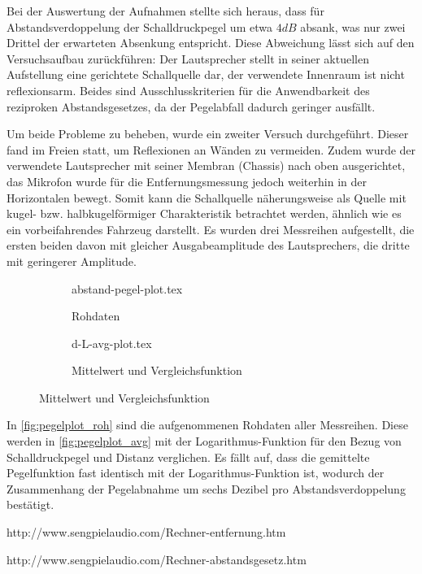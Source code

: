 Bei der Auswertung der Aufnahmen stellte sich heraus, dass für Abstandsverdoppelung der Schalldruckpegel um etwa \(4 dB\) absank, was nur zwei Drittel der erwarteten Absenkung entspricht. Diese Abweichung lässt sich auf den Versuchsaufbau zurückführen: Der Lautsprecher stellt in seiner aktuellen Aufstellung eine gerichtete Schallquelle dar, der verwendete Innenraum ist nicht reflexionsarm. Beides sind Ausschlusskriterien für die Anwendbarkeit des reziproken Abstandsgesetzes, da der Pegelabfall dadurch geringer ausfällt.

Um beide Probleme zu beheben, wurde ein zweiter Versuch durchgeführt. Dieser fand im Freien statt, um Reflexionen an Wänden zu vermeiden. Zudem wurde der verwendete Lautsprecher mit seiner Membran (Chassis) nach oben ausgerichtet, das Mikrofon wurde für die Entfernungsmessung jedoch weiterhin in der Horizontalen bewegt. Somit kann die Schallquelle näherungsweise als Quelle mit kugel- bzw. halbkugelförmiger Charakteristik betrachtet werden, ähnlich wie es ein vorbeifahrendes Fahrzeug darstellt. Es wurden drei Messreihen aufgestellt, die ersten beiden davon mit gleicher Ausgabeamplitude des Lautsprechers, die dritte mit geringerer Amplitude.

\begin{figure}[h]
    \begin{subfigure}{.5\textwidth}
        \centering
        {abstand-pegel-plot.tex}
        \caption{Rohdaten}
        \label{fig:pegelplot_roh}
    \end{subfigure}
    \hfil
    \begin{subfigure}{.5\textwidth}
        \centering
        {d-L-avg-plot.tex}
        \caption{Mittelwert und Vergleichsfunktion}
        \label{fig:pegelplot_avg}
    \end{subfigure}
\end{figure}

In \autoref{fig:pegelplot_roh} sind die aufgenommenen Rohdaten aller Messreihen. Diese werden in \autoref{fig:pegelplot_avg} mit der Logarithmus-Funktion für den Bezug von Schalldruckpegel und Distanz verglichen. Es fällt auf, dass die gemittelte Pegelfunktion fast identisch mit der Logarithmus-Funktion ist, wodurch der Zusammenhang der Pegelabnahme um sechs Dezibel pro Abstandsverdoppelung bestätigt.


http://www.sengpielaudio.com/Rechner-entfernung.htm

http://www.sengpielaudio.com/Rechner-abstandsgesetz.htm